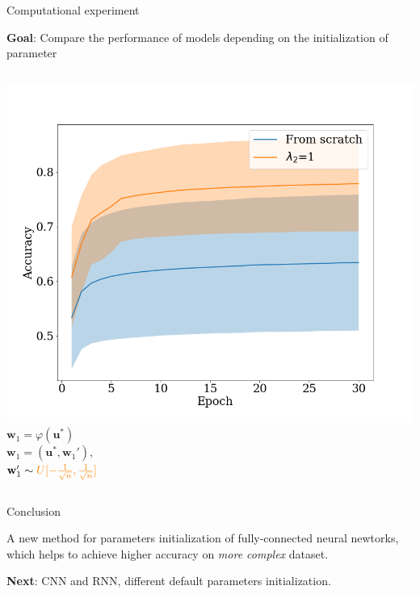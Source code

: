 \documentclass[dvipsnames]{beamer}
\begin{document}
\begin{frame}{Computational experiment}

    \textbf{Goal}: Compare the performance of models depending
on the initialization of parameter
    
    \begin{columns}[c]
    \includegraphics[width=\textwidth]{l2_acc.png}
    $\mathbf{w}_1 = \varphi(\mathbf{u}^*)$ \\
    \bigskip
    $\mathbf{w}_1 = (\mathbf{u}^*, \mathbf{w}_1'), $ \\
    \bigskip
    $\mathbf{w}_1' \sim {\color{orange} U[-\frac{1}{\sqrt{n}}, \frac{1}{\sqrt{n}}]}$
    
    \end{columns}

\end{frame}


\begin{frame}{Conclusion}

    A new method for parameters initialization of fully-connected neural newtorks, which helps to achieve higher accuracy on \textit{more complex} dataset.

    \bigskip

    \textbf{Next}: CNN and RNN, different default parameters initialization.

\end{frame}

\end{document}
